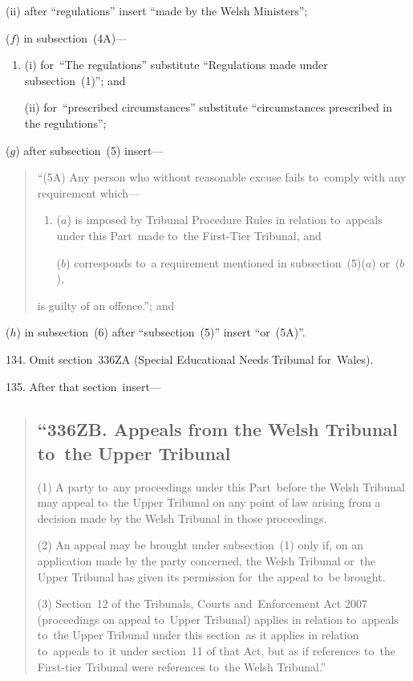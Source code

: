 \documentclass[12pt,a4paper]{article}
\begin{document}
\begin{enumerate}
\begin{enumerate}
(ii) after “regulations” insert “made by the Welsh Ministers”;
\end{enumerate}

($f$) in subsection~(4A)—
\begin{enumerate}\item[]
(i) for~“The regulations” substitute “Regulations made under subsection~(1)”; and

(ii) for~“prescribed circumstances” substitute “circumstances prescribed in the regulations”;
\end{enumerate}

($g$) after subsection~(5) insert—
\begin{quotation}
“(5A) Any person who without reasonable excuse fails to~comply with any requirement which—
\begin{enumerate}\item[]
($a$) is imposed by Tribunal Procedure Rules in relation to~appeals under this Part~made to~the First-Tier Tribunal, and

\begin{sloppypar}
($b$) corresponds to~a requirement mentioned in subsection~(5)($a$)  or~($b$),
\end{sloppypar}
\end{enumerate}
is guilty of an offence.”; and
\end{quotation}

($h$) in subsection~(6) after “subsection~(5)” insert “or~(5A)”.
\end{enumerate}

\medskip

134.  Omit section~336ZA (Special Educational Needs Tribunal for~Wales).

\medskip

135.  After that section~insert—
\begin{quotation}
\subsection*{\sloppy “336ZB.  Appeals from the Welsh Tribunal to~the Upper Tribunal}

(1)  A party to~any proceedings under this Part~before the Welsh Tribunal may appeal to~the Upper Tribunal on any point of law arising from a decision made by the Welsh Tribunal in those proceedings.

(2) An appeal may be brought under subsection~(1) only if, on an application made by the party concerned, the Welsh Tribunal or~the Upper Tribunal has given its permission for~the appeal to~be brought.

(3) Section~12 of the Tribunals, Courts and~Enforcement Act 2007 (proceedings on appeal to~Upper Tribunal) applies in relation to~appeals to~the Upper Tribunal under this section~as it applies in relation to~appeals to~it under section~11 of that Act, but as if references to~the First-tier Tribunal were references to~the Welsh Tribunal.”
\end{quotation}
\end{document}
